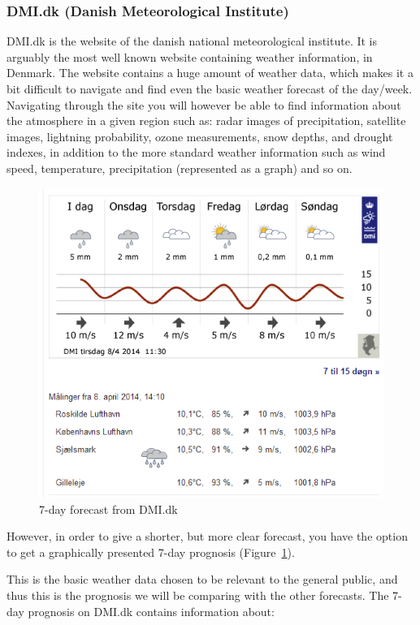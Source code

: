 
\FloatBarrier
\subsubsection*{DMI.dk (Danish Meteorological Institute)} %
\label{ssub:dmi_dk_danish_meteorological_institute_}

DMI.dk is the website of the danish national meteorological institute. 
It is arguably the most well known website containing weather information, in Denmark. 
The website contains a huge amount of weather data, which makes it a bit difficult to navigate and find even the basic weather forecast of the day/week. 
Navigating through the site you will however be able to find information about the atmosphere in a given region such as:
radar images of precipitation, satellite images, lightning probability, ozone measurements, snow depths, and drought indexes, in addition to the more standard weather information such as wind speed, temperature, precipitation (represented as a graph) and so on. 

\begin{figure}[!htbp]
     \centering
     \includegraphics[width=.75\textwidth]{images/Dmi1.png}
     \caption{7-day forecast from DMI.dk}
     \label{fig:dmi1}
 \end{figure}

However, in order to give a shorter, but more clear forecast, you have the option to get a graphically presented 7-day prognosis (Figure~\ref{fig:dmi1}).


This is the basic weather data chosen to be relevant to the general public, and thus this is the prognosis we will be comparing with the other forecasts. 
The 7-day prognosis on DMI.dk contains information about:

